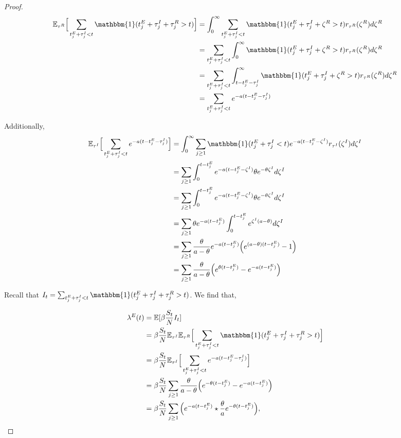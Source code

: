 \documentclass[12pt]{article}
\begin{document}
\begin{proof}
\begin{align*}
  \mathbb{E}_{\tau^R}\Big [ \sum_{t_j^E + \tau_j^I < t} \mathbbm{1} (t_j^E + \tau_j^I + \tau_j^R > t) \Big ]
  &= \int_0^\infty  \sum_{t_j^E + \tau_j^I < t} \mathbbm{1} (t_j^E + \tau_j^I + \zeta^R > t) r_{\tau^R} (\zeta^R) d\zeta^R \\
  &= \sum_{t_j^E + \tau_j^I < t}  \int_0^\infty  \mathbbm{1} (t_j^E + \tau_j^I + \zeta^R > t) r_{\tau^R} (\zeta^R) d\zeta^R \\
  &= \sum_{t_j^E + \tau_j^I < t}  \int_{t - t_j^E - \tau_j^I}^\infty  \mathbbm{1} (t_j^E + \tau_j^I + \zeta^R > t) r_{\tau^R} (\zeta^R) d\zeta^R \\
  &= \sum_{t_j^E + \tau_j^I < t}  e^{-a(t - t_j^E - \tau_j^I)}
\end{align*}


Additionally, 
\begin{align*}
  \mathbb{E}_{\tau^I} \Big [ \sum_{t_j^E + \tau_j^I < t}  e^{-a(t - t_j^E - \tau_j^I)} \Big ] 
  &= \int_0^\infty \sum_{j \geq 1} \mathbbm{1}(t_j^E + \tau_j^I < t) e^{- a(t - t_j^E - \zeta^I)} r_{\tau^I}(\zeta^I) d\zeta^I \\
  &= \sum_{j \geq 1} \int_0^{t - t_j^E} e^{- a(t - t_j^E - \zeta^I)} \theta e^{-\theta \zeta^I}  d\zeta^I \\
  &= \sum_{j \geq 1} \int_0^{t - t_j^E} e^{- a(t - t_j^E - \zeta^I)} \theta e^{-\theta \zeta^I}  d\zeta^I \\
  &= \sum_{j \geq 1} \theta e^{- a(t - t_j^E)} \int_0^{t - t_j^E}  e^{\zeta^I(a-\theta )}  d\zeta^I \\
  &=  \sum_{j \geq 1} \frac{\theta}{a - \theta}  e^{- a(t - t_j^E)}  \Big ( e^{(a-\theta )(t - t_j^E)} - 1  \Big )\\
  &=   \sum_{j \geq 1}  \frac{\theta}{a - \theta}  \Big ( e^{\theta (t - t_j^E)} - e^{- a(t - t_j^E)}  \Big )\\
\end{align*}



Recall that $I_t = \sum_{t_j^E + \tau_j^I < t} \mathbbm{1} (t_j^E + \tau_j^I + \tau_j^R > t)$. We find that,

\begin{align*}
  \lambda^E(t) &= \mathbb{E}[\beta \frac{S_t}{N} I_t] \\
  &= \beta \frac{S_t}{N} \mathbb{E}_{\tau^I} \mathbb{E}_{\tau^R}\Big [ \sum_{t_j^E + \tau_j^I < t} \mathbbm{1} (t_j^E + \tau_j^I + \tau_j^R > t) \Big ] \\
  &= \beta \frac{S_t}{N} \mathbb{E}_{\tau^I} \Big [ \sum_{t_j^E + \tau_j^I < t}  e^{-a(t - t_j^E - \tau_j^I)} \Big ] \\
  &= \beta \frac{S_t}{N} \sum_{j \geq 1}  \frac{\theta}{a - \theta}  \Big ( e^{-\theta (t - t_j^E)} - e^{- a(t - t_j^E)}  \Big ) \\
  &= \beta \frac{S_t}{N} \sum_{j \geq 1}  \Big ( e^{-a(t - t_j^E)} \star \frac{\theta}{a} e^{-\theta(t - t_j^E)} \Big ),
\end{align*}


\end{proof}
\end{document}
